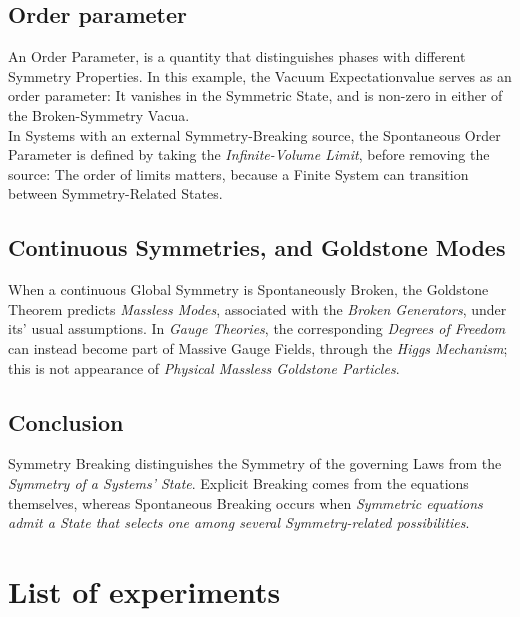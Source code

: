 \documentclass[a4paper, 10pt, onepage]{elegantbook}
\begin{document}
\subsection{Order parameter}

An Order Parameter, is a quantity that distinguishes phases with different Symmetry Properties. In this example, the Vacuum Expectationvalue serves as an order parameter: It vanishes in the Symmetric State, and is non-zero in either of the Broken-Symmetry Vacua.  \\

In Systems with an external Symmetry-Breaking source, the Spontaneous Order Parameter is defined by taking the \emph{Infinite-Volume Limit}, before removing the source:
The order of limits matters, because a Finite System can transition between Symmetry-Related States.

\subsection{Continuous Symmetries, and Goldstone Modes}

When a continuous Global Symmetry is Spontaneously Broken, the Goldstone Theorem predicts \emph{Massless Modes}, associated with the \emph{Broken Generators}, under its' usual assumptions. In \emph{Gauge Theories}, the corresponding \emph{Degrees of Freedom} can instead become part of Massive Gauge Fields, through the \emph{Higgs Mechanism}; this is not appearance of \emph{Physical Massless Goldstone Particles}.

\subsection{Conclusion}

Symmetry Breaking distinguishes the Symmetry of the governing Laws from the \emph{Symmetry of a Systems' State}. Explicit Breaking comes from the equations themselves, whereas Spontaneous Breaking occurs when \emph{Symmetric equations admit a State that selects one among several Symmetry-related possibilities}.



\section{List of experiments}
\end{document}
